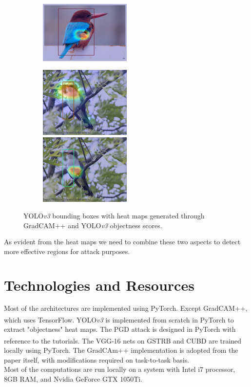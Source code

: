 \documentclass[letterpaper]{article}
\begin{document}
\begin{figure}[h]
\begin{subfigure}{\textwidth}
        \includegraphics[width = 0.5\textwidth, height = 0.25\textwidth]{Images/CUB-YOLO-Heat/new_yolo_bbox_heat_8.png}
    \end{subfigure}
    \begin{subfigure}{\textwidth}
        \includegraphics[width = 0.5\textwidth, height = 0.25\textwidth]{Images/CUB-VGG-Heat/new_vgg_bbox_heat_10.png}
        \includegraphics[width = 0.5\textwidth, height = 0.25\textwidth]{Images/CUB-YOLO-Heat/new_yolo_bbox_heat_10.png}
    \end{subfigure}
    \caption{YOLO\emph{v3} bounding boxes with heat maps generated through GradCAM++ and YOLO\emph{v3} objectness scores.}
    \label{fig:yolo-vgg}
\end{figure}
As evident from the heat maps we need to combine these two aspects to detect more effective regions for attack purposes.\\
\section{Technologies and Resources}
Most of the architectures are implemented using PyTorch. Except GradCAM++, which uses TensorFlow. YOLO\emph{v3} is implemented from scratch\textsuperscript{\cite{kathuria_2019}} in PyTorch to extract "objectness" heat maps. The PGD attack is designed in PyTorch with reference to the tutorials\textsuperscript{\cite{madry}}. The VGG-16 nets on GSTRB and CUBD are trained locally using PyTorch. The GradCAm++ implementation is adopted from the paper itself, with modifications required on task-to-task basis.\\
Most of the computations are run locally on a system with Intel i7 processor, 8GB RAM, and Nvidia GeForce GTX 1050Ti.\\
\end{document}
